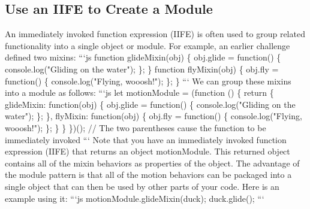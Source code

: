 \documentclass{article}%
\begin{document}
\subsection{Use an IIFE to Create a Module}%
\label{subsec:UseanIIFEtoCreateaModule}%
An immediately invoked function expression (IIFE) is often used to group related functionality into a single object or module. For example, an earlier challenge defined two mixins:\newline%
```js\newline%
function glideMixin(obj) \{\newline%
  obj.glide = function() \{\newline%
    console.log("Gliding on the water");\newline%
  \};\newline%
\}\newline%
function flyMixin(obj) \{\newline%
  obj.fly = function() \{\newline%
    console.log("Flying, wooosh!");\newline%
  \};\newline%
\}\newline%
```\newline%
We can group these mixins into a module as follows:\newline%
```js\newline%
let motionModule = (function () \{\newline%
  return \{\newline%
    glideMixin: function(obj) \{\newline%
      obj.glide = function() \{\newline%
        console.log("Gliding on the water");\newline%
      \};\newline%
    \},\newline%
    flyMixin: function(obj) \{\newline%
      obj.fly = function() \{\newline%
        console.log("Flying, wooosh!");\newline%
      \};\newline%
    \}\newline%
  \}\newline%
\})(); // The two parentheses cause the function to be immediately invoked\newline%
```\newline%
Note that you have an immediately invoked function expression (IIFE) that returns an object motionModule. This returned object contains all of the mixin behaviors as properties of the object.\newline%
The advantage of the module pattern is that all of the motion behaviors can be packaged into a single object that can then be used by other parts of your code. Here is an example using it:\newline%
```js\newline%
motionModule.glideMixin(duck);\newline%
duck.glide();\newline%
```\newline%
\end{document}
